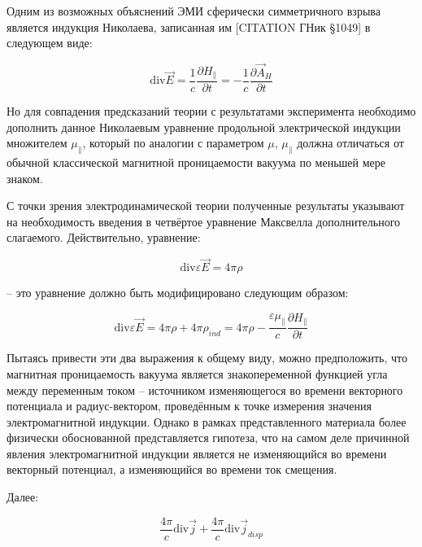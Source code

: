 \documentclass[12pt, a4paper]{article}
\begin{document}
Одним из возможных объяснений ЭМИ сферически симметричного взрыва является индукция Николаева, записанная им [CITATION ГНик §1049] в следующем виде:

\begin{equation}
\text{div} \vec{E} = \frac{1}{c} \frac{\partial H_{\parallel}}{\partial t} = -\frac{1}{c} \frac{\partial \vec{A}_H}{\partial t}
\label{eq:nikolaev_induction}
\end{equation}

Но для совпадения предсказаний теории с результатами эксперимента необходимо дополнить данное Николаевым уравнение продольной электрической индукции множителем $\mu_{\parallel}$, который по аналогии с параметром $\mu$, $\mu_{\parallel}$ должна отличаться от обычной классической магнитной проницаемости вакуума по меньшей мере знаком.

С точки зрения электродинамической теории полученные результаты указывают на необходимость введения в четвёртое уравнение Максвелла дополнительного слагаемого. Действительно, уравнение:

\begin{equation}
\text{div} \varepsilon \vec{E} = 4\pi \rho
\label{eq:maxwell_4_original}
\end{equation}

-- это уравнение должно быть модифицировано следующим образом:

\begin{equation}
\text{div} \varepsilon \vec{E} = 4\pi \rho + 4\pi \rho_{ind} = 4\pi \rho - \frac{\varepsilon \mu_{\parallel}}{c} \frac{\partial H_{\parallel}}{\partial t}
\label{eq:maxwell_4_modified}
\end{equation}

Пытаясь привести эти два выражения к общему виду, можно предположить, что магнитная проницаемость вакуума является знакопеременной функцией угла между переменным током -- источником изменяющегося во времени векторного потенциала и радиус-вектором, проведённым к точке измерения значения электромагнитной индукции. Однако в рамках представленного материала более физически обоснованной представляется гипотеза, что на самом деле причинной явления электромагнитной индукции является не изменяющийся во времени векторный потенциал, а изменяющийся во времени ток смещения.

Далее:

\begin{equation}
\frac{4\pi}{c} \text{div} \vec{j} + \frac{4\pi}{c} \text{div} \vec{j}_{disp}
\label{eq:div_currents}
\end{equation}
\end{document}
